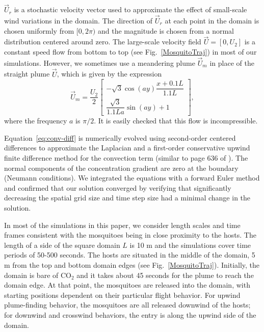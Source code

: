 \documentclass[10pt]{article}
\begin{document}
$\vec{U}_r$ is a stochastic velocity vector used to approximate the effect of small-scale wind variations in the domain. The direction of $\vec{U}_r$ at each point in the domain is chosen uniformly from $[0,2\pi)$ and the magnitude is chosen from a normal distribution centered around zero. 
The large-scale velocity field $\vec{U} = [0,U_2]$ is a constant speed flow from bottom to top (see Fig.~\ref{MosquitoTraj}) in most of our simulations. However, we sometimes use a meandering plume $\vec{U}_m$ in place of the straight plume $\vec{U}$, which is given by the expression
\begin{equation}
	\vec{U}_m = \frac{U_2}{2}\begin{bmatrix} -\sqrt{3}\cos(ay)\dfrac{x+0.1L}{1.1L} \label{eqn:meander} \\
	 \dfrac{\sqrt{3}}{1.1L a}\sin(ay)+1\end{bmatrix}, 
\end{equation}
where the frequency $a$ is $\pi/2$. It is easily checked that this flow is incompressible. 

Equation~\eqref{eq:conv-diff} is numerically evolved using second-order centered differences to approximate the Laplacian and  a first-order conservative upwind finite difference method for the convection term (similar to page 636 of \cite{Leveque1996}). The normal components of the concentration gradient are zero at the boundary (Neumann conditions).  We integrated the equations with a forward Euler method and confirmed that our solution converged by verifying that significantly decreasing the spatial grid size and time step size had a minimal change in the solution. 

In most of the simulations in this paper, we consider length scales and time frames consistent with the mosquitoes being in close proximity to the hosts. The length of a side of the square domain $L$ is 10 m and the simulations cover time periods of 50-500 seconds. The hosts are situated in the middle of the domain, 5 m from the top and bottom domain edges (see Fig.~\ref{MosquitoTraj}). Initially, the domain is bare of $\mbox{CO}_2$ and it takes about 45 seconds for the plume to reach the domain edge. At that point, the mosquitoes are released into the domain, with starting positions dependent on their particular flight behavior. For upwind plume-finding behavior, the mosquitoes are all released downwind of the hosts;  for downwind and crosswind behaviors, the entry is along the upwind side of the domain.

\end{document}

